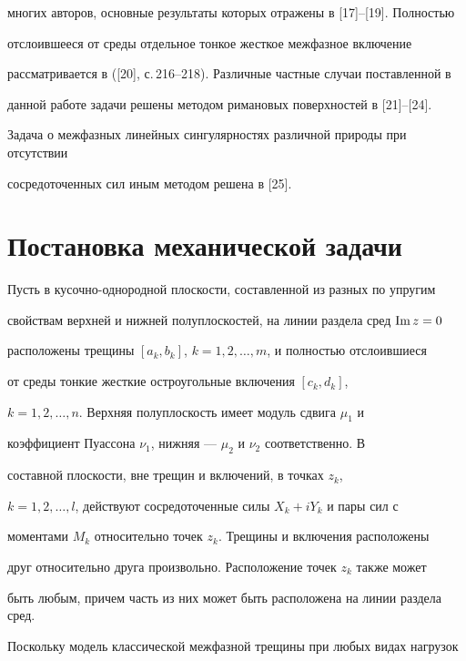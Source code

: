 многих авторов, основные результаты которых отражены в [17]--[19]. Полностью 


отслоившееся от среды отдельное тонкое жесткое межфазное включение 


рассматривается в ([20], с.\,216--218). Различные частные случаи поставленной в 


данной работе задачи решены методом римановых поверхностей в [21]--[24]. 


Задача о межфазных линейных сингулярностях различной природы при отсутствии 


сосредоточенных сил иным методом решена в [25]. 


 


 


\section{Постановка механической задачи} 


 


Пусть в кусочно-однородной плоскости, составленной из разных по упругим 


свойствам верхней и нижней полуплоскостей, на линии раздела сред $\operatorname{Im} z=0$ 


расположены трещины $[a_k,b_k]$, $k=1,2,\dotsc,m$, и полностью отслоившиеся 


от среды тонкие жесткие остроугольные включения $[c_k,d_k]$, 


$k=1,2,\dotsc,n$. Верхняя полуплоскость имеет модуль сдвига $\mu_1$ и 


коэффициент Пуассона $\nu_1$, нижняя --- $\mu_2$ и $\nu_2$ соответственно. В 


составной плоскости, вне трещин и включений, в точках $z_k$, 


$k=1,2,\dotsc,l$, действуют сосредоточенные силы $X_k+i Y_k$ и пары сил с 


моментами $M_k$ относительно точек $z_k$. Трещины и включения расположены 


друг относительно друга произвольно. Расположение точек $z_k$ также может 


быть любым, причем часть из них может быть расположена на линии раздела сред. 


 


Поскольку модель классической межфазной трещины при любых видах нагрузок 


